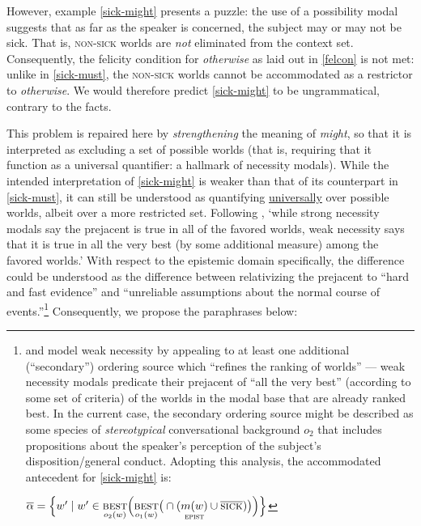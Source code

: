 However, example \ref{sick-might} presents a puzzle: the use of a possibility modal suggests that as far as the speaker is concerned, the subject may or may not be sick. That is, \textsc{non-sick} worlds are \textit{not} eliminated from the context set. 
Consequently, the felicity condition for \textit{otherwise} as laid out in \ref{felcon} is not met: unlike in \ref{sick-must}, the \textsc{non-sick} worlds cannot be accommodated as a restrictor to \textit{otherwise}. We would therefore predict \ref{sick-might} to be ungrammatical, contrary to the facts.

This problem is repaired here by \textit{strengthening} the meaning of \textit{might}, so that it is interpreted as excluding a set of possible worlds (that is, requiring that it function as a universal quantifier: a hallmark of necessity modals). While the intended interpretation of \ref{sick-might} is weaker than that of its counterpart in \ref{sick-must}, it can still be understood as quantifying \ul{universally} over possible worlds, albeit over a more restricted set. 
Following \citet[116, fn. 11]{VonFintel2008}, `while strong necessity modals say the prejacent is true in all of the favored worlds, weak necessity says that it is true in all the very best (by some additional measure) among the favored worlds.' With respect to the epistemic domain specifically, the difference could be understood as the difference between relativizing the prejacent to ``hard and fast evidence'' and ``unreliable assumptions about the normal course of events.''\footnote{ and \citet{Rubinstein2012} model weak necessity by appealing to at least one additional (``secondary'') ordering source which ``refines the ranking of worlds'' --- weak necessity modals predicate their prejacent of ``all the very best'' (according to some set of criteria) of the worlds in the modal base that are already ranked best.  In the current case, the secondary ordering source might be described as some species of \textit{stereotypical} conversational background $ o_2 $ that includes propositions about the speaker's perception of the subject's disposition/general conduct. Adopting this analysis, the accommodated antecedent for \ref{sick-might} is:
	
	\pex  $\overline{\alpha}=\Big\{w'\mid w'\in\underset{o_2(w)}{\textsc{best}}\Big(\underset{o_1(w)}{\textsc{best}}\big(\cap (\underset{\textsc{epist}}{m(w)}\cup\overline{\textsc{sick}})\big)\Big)\Big\} $
	
	\xe} %
Consequently, we propose the paraphrases below:

